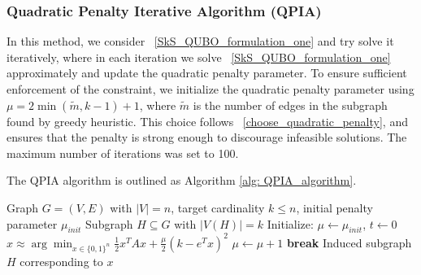 \documentclass{article}
\newcommand{\Omkar}[1]{{\color{teal}#1}}
\begin{document}


\subsubsection{Quadratic Penalty Iterative Algorithm (QPIA)}
In this method, we consider ~\eqref{SkS_QUBO_formulation_one} and try solve it iteratively, where in each iteration we solve ~\eqref{SkS_QUBO_formulation_one}  approximately and update the quadratic penalty parameter. 
To ensure sufficient enforcement of the constraint, we initialize the quadratic penalty parameter using $\mu = 2\min(\tilde{m}, k-1) + 1$, where $\tilde{m}$ is the number of edges in the subgraph found by greedy heuristic. This choice follows ~\eqref{choose_quadratic_penalty}, and ensures that the penalty is strong enough to discourage infeasible solutions. The maximum number of iterations was set to 100.

The QPIA algorithm is outlined as Algorithm \ref{alg: QPIA_algorithm}.

\begin{algorithm}[H]
    \caption{Quadratic Penalty Iterative Algorithm  (QPIA) for the ~\eqref{SkS_QUBO_formulation_one} relaxation}
    \label{alg: QPIA_algorithm}
    \begin{algorithmic}[1]
        \Require Graph $G = (V, E)$ with $|V| = n$, target cardinality $k \le n$, initial penalty parameter $\mu_{init}$
        \Ensure Subgraph $H \subseteq G$ with $|V(H)| = k$
        \State Initialize: $\mu \gets \mu_{init}$, $t \gets 0$
        \Repeat
            \State $x \approx \arg\min_{x \in \{0,1\}^n} \frac{1}{2} x^T A x + \frac{\mu}{2}(k - e^T x)^2$
                \State $\mu \gets \mu + 1$
            \Else
                \State \textbf{break}
            \EndIf
        \State \Return Induced subgraph $H$ corresponding to $x$
    \end{algorithmic}
\end{algorithm}
\end{document}
